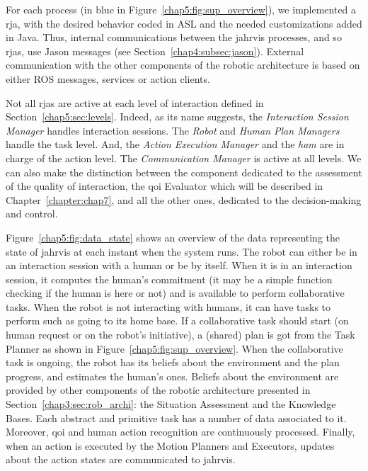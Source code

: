 \documentclass[a4paper,11pt,twoside]{StyleThese}
\begin{document}
For each process (in blue in Figure~\ref{chap5:fig:sup_overview}), we implemented a \acrfull{rja}, with the desired behavior coded in ASL and the needed customizations added in Java. Thus, internal communications between the \acrshort{jahrvis} processes, and so \acrshort{rja}s, use Jason messages (see Section~\ref{chap4:subsec:jason}). External communication with the other components of the robotic architecture is based on either ROS messages, services or action clients.

Not all \acrshort{rja}s are active at each level of interaction defined in Section~\ref{chap5:sec:levels}. Indeed, as its name suggests, the \textit{Interaction Session Manager} handles interaction sessions. The \textit{Robot} and \textit{Human Plan Managers} handle the task level. And, the \textit{Action Execution Manager} and the \textit{\acrlong{ham}} are in charge of the action level. The \textit{Communication Manager} is active at all levels. We can also make the distinction between the component dedicated to the assessment of the quality of interaction, \ie the \acrshort{qoi} Evaluator which will be described in Chapter~\ref{chapter:chap7}, and all the other ones, dedicated to the decision-making and control.

Figure~\ref{chap5:fig:data_state} shows an overview of the data representing the state of \acrshort{jahrvis} at each instant when the system runs. The robot can either be in an interaction session with a human or be by itself. When it is in an interaction session, it computes the human's commitment (it may be a simple function checking if the human is here or not) and is available to perform collaborative tasks. When the robot is not interacting with humans, it can have tasks to perform such as going to its home base. If a collaborative task should start (on human request or on the robot's initiative), a (shared) plan is got from the Task Planner as shown in Figure~\ref{chap5:fig:sup_overview}. When the collaborative task is ongoing, the robot has its beliefs about the environment and the plan progress, and estimates the human's ones. Beliefs about the environment are provided by other components of the robotic architecture presented in Section~\ref{chap3:sec:rob_archi}: the Situation Assessment and the Knowledge Bases. Each abstract and primitive task has a number of data associated to it. Moreover, \acrlong{qoi} and human action recognition are continuously processed. Finally, when an action is executed by the Motion Planners and Executors, updates about the action states are communicated to \acrshort{jahrvis}.
\end{document}
